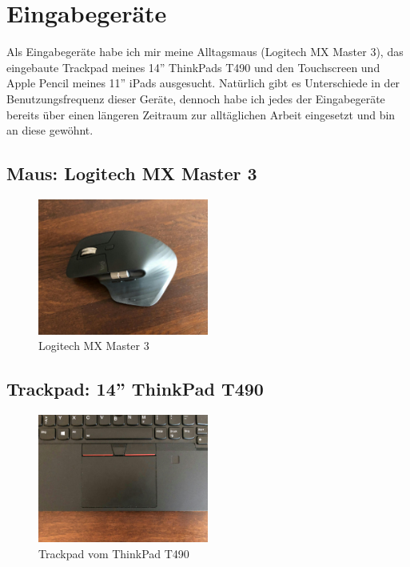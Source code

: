 \documentclass{article}
\begin{document}
\newpage

\section{Eingabegeräte}

Als Eingabegeräte habe ich mir meine Alltagsmaus (Logitech MX Master 3), das
eingebaute Trackpad meines 14'' ThinkPads T490 und den Touchscreen und Apple
Pencil meines 11'' iPads ausgesucht. Natürlich gibt es Unterschiede in der
Benutzungsfrequenz dieser Geräte, dennoch habe ich jedes der Eingabegeräte
bereits über einen längeren Zeitraum zur alltäglichen Arbeit eingesetzt und bin
an diese gewöhnt.

\subsection{Maus: Logitech MX Master 3}

\begin{figure}[h!]
	\centering
	\includegraphics[width=0.5\textwidth]{maus.jpg}
	\caption{Logitech MX Master 3}
\end{figure}

\subsection{Trackpad: 14'' ThinkPad T490}

\begin{figure}[h!]
	\centering
	\includegraphics[width=0.5\textwidth]{trackpad}
	\caption{Trackpad vom ThinkPad T490}
\end{figure}
\end{document}
